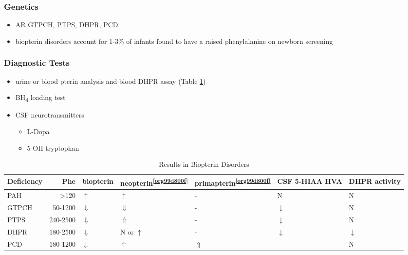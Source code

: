 \documentclass[12pt]{scrartcl}
\begin{document}
\subsubsection{Genetics}
\label{sec:orgb52db69}
\begin{itemize}
\item AR GTPCH, PTPS, DHPR, PCD
\item biopterin disorders account for 1-3\% of infants found to have a
raised phenylalanine on newborn screening
\end{itemize}

\subsubsection{Diagnostic Tests}
\label{sec:orgbd2a13a}
\begin{itemize}
\item urine or blood pterin analysis and blood DHPR assay (Table \ref{tab:org29414f1})
\item BH\textsubscript{4} loading test
\item CSF neurotransmitters
\begin{itemize}
\item L-Dopa
\item 5-OH-tryptophan
\end{itemize}
\end{itemize}

\begin{table}[htbp]
\caption{\label{tab:org29414f1}Results in Biopterin Disorders}
\centering
\begin{tabular}{lrlllll}
Deficiency & Phe & biopterin\footnotemark & neopterin\textsuperscript{\ref{org99d800f}} & primapterin\textsuperscript{\ref{org99d800f}} & CSF 5-HIAA HVA & DHPR activity\\
\hline
PAH & \textgreater{}120 & \(\uparrow\) & \(\uparrow\) & - & N & N\\
GTPCH & 50-1200 & \(\Downarrow\) & \(\Downarrow\) & - & \(\downarrow\) & N\\
PTPS & 240-2500 & \(\Downarrow\) & \(\Uparrow\) & - & \(\downarrow\) & N\\
DHPR & 180-2500 & \(\Downarrow\) & N or \(\uparrow\) & - & \(\downarrow\) & \(\downarrow\)\\
PCD & 180-1200 & \(\downarrow\) & \(\uparrow\) & \(\Uparrow\) &  & N\\
\end{tabular}
\end{table}
\end{document}
